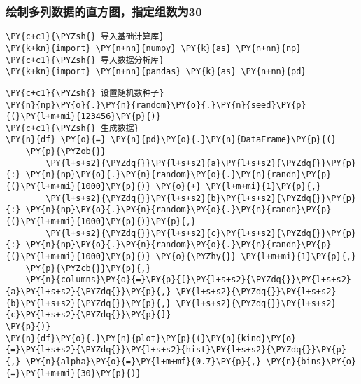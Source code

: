     \hypertarget{ux7ed8ux5236ux591aux5217ux6570ux636eux7684ux76f4ux65b9ux56feux6307ux5b9aux7ec4ux6570ux4e3a30}{%
\subsubsection{绘制多列数据的直方图，指定组数为30}\label{ux7ed8ux5236ux591aux5217ux6570ux636eux7684ux76f4ux65b9ux56feux6307ux5b9aux7ec4ux6570ux4e3a30}}

    \begin{tcolorbox}[breakable, size=fbox, boxrule=1pt, pad at break*=1mm,colback=cellbackground, colframe=cellborder]
\begin{Verbatim}[commandchars=\\\{\}]
\PY{c+c1}{\PYZsh{} 导入基础计算库}
\PY{k+kn}{import} \PY{n+nn}{numpy} \PY{k}{as} \PY{n+nn}{np}
\PY{c+c1}{\PYZsh{} 导入数据分析库}
\PY{k+kn}{import} \PY{n+nn}{pandas} \PY{k}{as} \PY{n+nn}{pd}
\end{Verbatim}
\end{tcolorbox}

    \begin{tcolorbox}[breakable, size=fbox, boxrule=1pt, pad at break*=1mm,colback=cellbackground, colframe=cellborder]
\begin{Verbatim}[commandchars=\\\{\}]
\PY{c+c1}{\PYZsh{} 设置随机数种子}
\PY{n}{np}\PY{o}{.}\PY{n}{random}\PY{o}{.}\PY{n}{seed}\PY{p}{(}\PY{l+m+mi}{123456}\PY{p}{)}
\PY{c+c1}{\PYZsh{} 生成数据}
\PY{n}{df} \PY{o}{=} \PY{n}{pd}\PY{o}{.}\PY{n}{DataFrame}\PY{p}{(}
    \PY{p}{\PYZob{}}
        \PY{l+s+s2}{\PYZdq{}}\PY{l+s+s2}{a}\PY{l+s+s2}{\PYZdq{}}\PY{p}{:} \PY{n}{np}\PY{o}{.}\PY{n}{random}\PY{o}{.}\PY{n}{randn}\PY{p}{(}\PY{l+m+mi}{1000}\PY{p}{)} \PY{o}{+} \PY{l+m+mi}{1}\PY{p}{,}
        \PY{l+s+s2}{\PYZdq{}}\PY{l+s+s2}{b}\PY{l+s+s2}{\PYZdq{}}\PY{p}{:} \PY{n}{np}\PY{o}{.}\PY{n}{random}\PY{o}{.}\PY{n}{randn}\PY{p}{(}\PY{l+m+mi}{1000}\PY{p}{)}\PY{p}{,}
        \PY{l+s+s2}{\PYZdq{}}\PY{l+s+s2}{c}\PY{l+s+s2}{\PYZdq{}}\PY{p}{:} \PY{n}{np}\PY{o}{.}\PY{n}{random}\PY{o}{.}\PY{n}{randn}\PY{p}{(}\PY{l+m+mi}{1000}\PY{p}{)} \PY{o}{\PYZhy{}} \PY{l+m+mi}{1}\PY{p}{,}
    \PY{p}{\PYZcb{}}\PY{p}{,}
    \PY{n}{columns}\PY{o}{=}\PY{p}{[}\PY{l+s+s2}{\PYZdq{}}\PY{l+s+s2}{a}\PY{l+s+s2}{\PYZdq{}}\PY{p}{,} \PY{l+s+s2}{\PYZdq{}}\PY{l+s+s2}{b}\PY{l+s+s2}{\PYZdq{}}\PY{p}{,} \PY{l+s+s2}{\PYZdq{}}\PY{l+s+s2}{c}\PY{l+s+s2}{\PYZdq{}}\PY{p}{]}
\PY{p}{)}
\PY{n}{df}\PY{o}{.}\PY{n}{plot}\PY{p}{(}\PY{n}{kind}\PY{o}{=}\PY{l+s+s2}{\PYZdq{}}\PY{l+s+s2}{hist}\PY{l+s+s2}{\PYZdq{}}\PY{p}{,} \PY{n}{alpha}\PY{o}{=}\PY{l+m+mf}{0.7}\PY{p}{,} \PY{n}{bins}\PY{o}{=}\PY{l+m+mi}{30}\PY{p}{)}
\end{Verbatim}
\end{tcolorbox}

